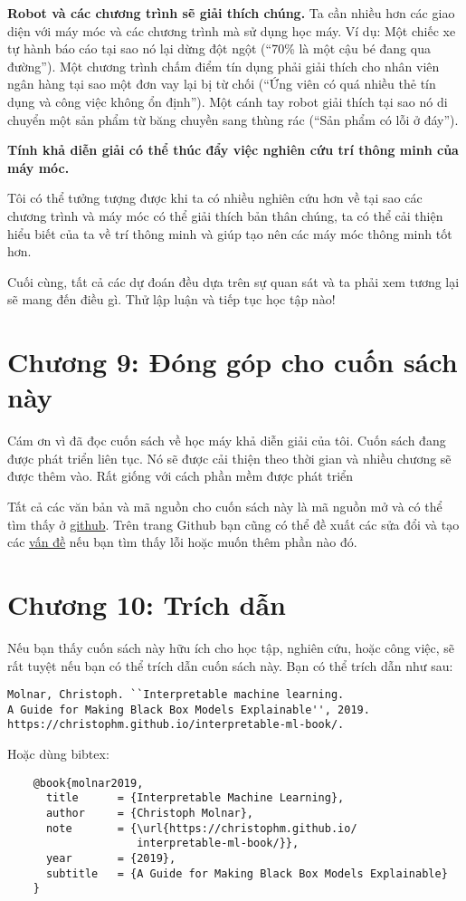 \textbf{Robot và các chương trình sẽ giải thích chúng.}
Ta cần nhiều hơn các giao diện với máy móc và các chương trình mà sử dụng học máy. Ví dụ: Một chiếc xe tự hành báo cáo tại sao nó lại dừng đột ngột (``70\% là một cậu bé đang qua đường''). Một chương trình chấm điểm tín dụng phải giải thích cho nhân viên ngân hàng tại sao một đơn vay lại bị từ chối (``Ứng viên có quá nhiều thẻ tín dụng và công việc không ổn định''). Một cánh tay robot giải thích tại sao nó di chuyển một sản phẩm từ băng chuyền sang thùng rác (``Sản phẩm có lỗi ở đáy'').

\textbf{Tính khả diễn giải có thể thúc đẩy việc nghiên cứu trí thông minh của máy móc.}

Tôi có thể tưởng tượng được khi ta có nhiều nghiên cứu hơn về tại sao các chương trình và máy móc có thể giải thích bản thân chúng, ta có thể cải thiện hiểu biết của ta về trí thông minh và giúp tạo nên các máy móc thông minh tốt hơn.

Cuối cùng, tất cả các dự đoán đều dựa trên sự quan sát và ta phải xem tương lại sẽ mang đến điều gì. Thử lập luận và tiếp tục học tập nào!
\clearpage

\chapter*{Chương 9: Đóng góp cho cuốn sách này}

Cám ơn vì đã đọc cuốn sách về học máy khả diễn giải của tôi. Cuốn sách đang được phát triển liên tục. Nó sẽ được cải thiện theo thời gian và nhiều chương sẽ được thêm vào. Rất giống với cách phần mềm được phát triển

Tất cả các văn bản và mã nguồn cho cuốn sách này là mã nguồn mở và có thể tìm thấy ở \href{https://github.com/christophM/interpretable-ml-book}{github}. Trên trang Github bạn cũng có thể đề xuất các sửa đổi và tạo các \href{https://github.com/christophM/interpretable-ml-book/issues}{vấn đề} nếu bạn tìm thấy lỗi hoặc muốn thêm phần nào đó.
\clearpage

\chapter*{Chương 10: Trích dẫn}

Nếu bạn thấy cuốn sách này hữu ích cho học tập, nghiên cứu, hoặc công việc, sẽ rất tuyệt nếu bạn có thể trích dẫn cuốn sách này. Bạn có thể trích dẫn như sau:
\begin{verbatim}
Molnar, Christoph. ``Interpretable machine learning. 
A Guide for Making Black Box Models Explainable'', 2019.
https://christophm.github.io/interpretable-ml-book/.
\end{verbatim} 
Hoặc dùng bibtex:
\begin{verbatim}
    @book{molnar2019,
      title      = {Interpretable Machine Learning},
      author     = {Christoph Molnar},
      note       = {\url{https://christophm.github.io/
                    interpretable-ml-book/}},
      year       = {2019},
      subtitle   = {A Guide for Making Black Box Models Explainable}
    }
\end{verbatim}

